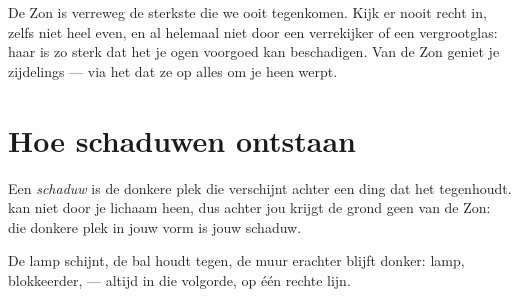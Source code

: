 \begin{remark}\label{rem:g1:light-and-shadows:sun}
De Zon is verreweg de sterkste  die we ooit tegenkomen. Kijk
er nooit recht in, zelfs niet heel even, en al helemaal niet door een
verrekijker of een vergrootglas: haar  is zo sterk dat het je
ogen voorgoed kan beschadigen. Van de Zon geniet je zijdelings ---
via het  dat ze op alles om je heen werpt.
\end{remark}

\section{Hoe schaduwen ontstaan}

\begin{definition}[Schaduw]\label{def:g1:light-and-shadows:shadow}
Een \emph{schaduw} is de donkere plek die verschijnt
achter een ding dat het  tegenhoudt.  kan niet door je
lichaam heen, dus achter jou krijgt de grond geen  van de Zon:
die donkere plek in jouw vorm is jouw schaduw.
\end{definition}

\begin{omfigure}

{\small De lamp schijnt, de bal houdt tegen, de muur erachter blijft
donker: lamp, blokkeerder,  --- altijd in die volgorde, op één
rechte lijn.}
\end{omfigure}

